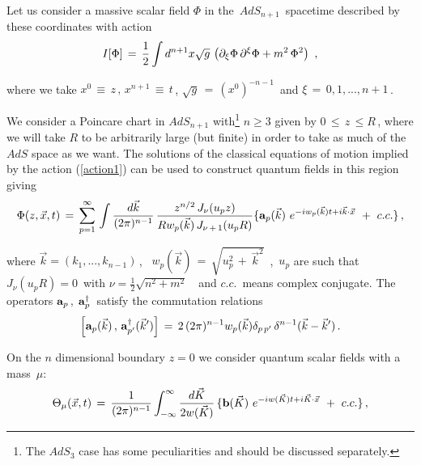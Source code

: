 \documentclass[a4paper,12pt]{article}
\begin{document}
Let us  consider a massive scalar field $\Phi$ in the $\,AdS_{n+1}\,$
spacetime described by these coordinates with action
\begin{equation}
\label{action1}
I[\Phi ]\,=\, {1\over 2} \int d^{n+1}x \sqrt{g}\,
\left(\partial_\xi \Phi \, \partial^\xi \Phi
+m^2\,\Phi^2 \right)
\,\,,
\end{equation}
  
\noindent where we take $x^0\,\equiv\,z\,,\,x^{n+1}\,\equiv\,t\,$,
$\sqrt{g}\,=\,(x^0)^{-n-1}\,$ and $\xi\,=\,0,1,...,n+1\,$.
   

We consider a  Poincare chart in $AdS_{n+1}$ with\footnote{The $AdS_3$ case 
has some peculiarities and should be discussed separately.}  $n \ge 3$
given by 
$0\,\le\,z\,\le R\,$, where we will take $R$ to be 
arbitrarily large (but finite) in order to take as much of the $AdS$ space as we want.
The solutions of the classical equations of motion implied by the action
(\ref{action1}) can be used to construct quantum fields in this region 
giving\cite{BB1,BB2} 
\begin{equation}
\label{QF}
\Phi(z,\vec x,t)\,=\,\sum_{p=1}^\infty \,
\int { d \vec k \over (2\pi)^{n-1}}\,
{z^{n/2} \,J_\nu (u_p z ) \over R w_p(\vec k ) 
\,J_{\nu\,+\,1} (u_p R ) }
\lbrace { {\bf a}_p(\vec k )\ }
 e^{-iw_p(\vec k ) t +i\vec k \cdot \vec x}\,
\,+\,\,c.c.\rbrace\,,
\end{equation}


\noindent where $\vec k = (k_1 ,..., k_{n-1})\,$, \, 
$w_p(\vec k ) \,=\,\sqrt{ u_p^2\,+\,{\vec k}^2}$\, ,\, 
$u_p$ are such that $J_\nu(u_p R)=0$\, 
with $\nu=\frac 12\sqrt{n^2+m^2}$\,  \, 
and $c.c.$\, means complex conjugate. The operators 
${\bf a}_p\, ,\;{\bf a}^{\dagger}_p \,$ satisfy the commutation relations
\begin{equation}
\label{canonical1}
\Big[ {\bf a}_p(\vec k )\,,\,{\bf a}^\dagger_{p^\prime}({\vec k}^\prime  )
\Big]\,=\, 2\, (2\pi)^{n-1} w_p(\vec k )   
\delta_{p\,  p^\prime}\,\delta^{n-1} (\vec k -
{\vec k}^\prime )\,.
\end{equation}
 

On the $n$ dimensional boundary $ z = 0 $ we  consider quantum scalar fields
with a mass~$\mu$:
\begin{equation}
\label{BF}
\Theta_\mu ( \vec x ,t)\,=\,{1\over (2\pi)^{n-1}}
\int^{\infty}_{-\infty} { d \vec K  \over 2 w(\vec K ) }\,
\lbrace { {\bf b}( \vec K )\ }
 e^{-iw(\vec K ) t +i \vec K \cdot  \vec x }\,
\,+\,\,c.c.\rbrace\,,
\end{equation}
\end{document}
